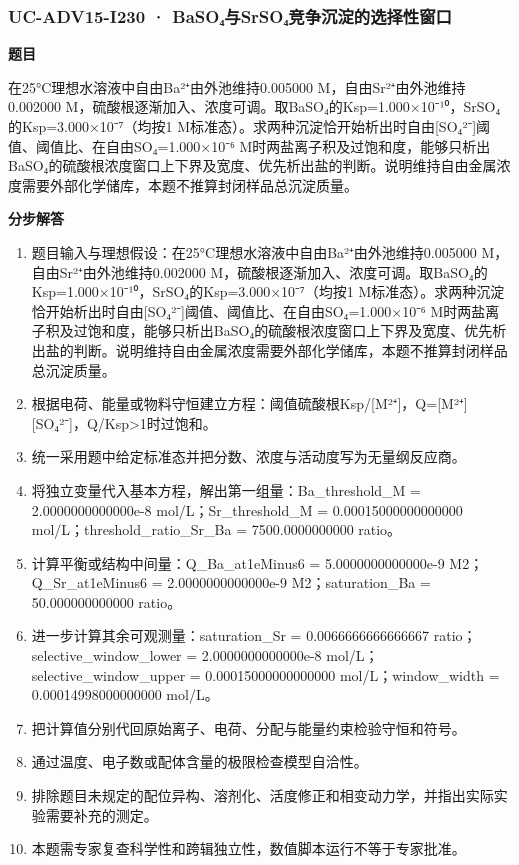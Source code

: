 \documentclass[UTF8,11pt,a4paper]{ctexart}
\begin{document}
\subsubsection*{UC-ADV15-I230 · BaSO₄与SrSO₄竞争沉淀的选择性窗口}
\noindent\textbf{题目}\par
在25°C理想水溶液中自由Ba²⁺由外池维持0.005000 M，自由Sr²⁺由外池维持0.002000 M，硫酸根逐渐加入、浓度可调。取BaSO₄的Ksp=1.000×10⁻¹⁰，SrSO₄的Ksp=3.000×10⁻⁷（均按1 M标准态）。求两种沉淀恰开始析出时自由[SO₄²⁻]阈值、阈值比、在自由SO₄=1.000×10⁻⁶ M时两盐离子积及过饱和度，能够只析出BaSO₄的硫酸根浓度窗口上下界及宽度、优先析出盐的判断。说明维持自由金属浓度需要外部化学储库，本题不推算封闭样品总沉淀质量。\par
\medskip\noindent\textbf{分步解答}
\begin{enumerate}
\item 题目输入与理想假设：在25°C理想水溶液中自由Ba²⁺由外池维持0.005000 M，自由Sr²⁺由外池维持0.002000 M，硫酸根逐渐加入、浓度可调。取BaSO₄的Ksp=1.000×10⁻¹⁰，SrSO₄的Ksp=3.000×10⁻⁷（均按1 M标准态）。求两种沉淀恰开始析出时自由[SO₄²⁻]阈值、阈值比、在自由SO₄=1.000×10⁻⁶ M时两盐离子积及过饱和度，能够只析出BaSO₄的硫酸根浓度窗口上下界及宽度、优先析出盐的判断。说明维持自由金属浓度需要外部化学储库，本题不推算封闭样品总沉淀质量。
\item 根据电荷、能量或物料守恒建立方程：阈值硫酸根Ksp/[M²⁺]，Q=[M²⁺][SO₄²⁻]，Q/Ksp>1时过饱和。
\item 统一采用题中给定标准态并把分数、浓度与活动度写为无量纲反应商。
\item 将独立变量代入基本方程，解出第一组量：Ba\_threshold\_M = 2.0000000000000e-8 mol/L；Sr\_threshold\_M = 0.00015000000000000 mol/L；threshold\_ratio\_Sr\_Ba = 7500.0000000000 ratio。
\item 计算平衡或结构中间量：Q\_Ba\_at1eMinus6 = 5.0000000000000e-9 M2；Q\_Sr\_at1eMinus6 = 2.0000000000000e-9 M2；saturation\_Ba = 50.000000000000 ratio。
\item 进一步计算其余可观测量：saturation\_Sr = 0.0066666666666667 ratio；selective\_window\_lower = 2.0000000000000e-8 mol/L；selective\_window\_upper = 0.00015000000000000 mol/L；window\_width = 0.00014998000000000 mol/L。
\item 把计算值分别代回原始离子、电荷、分配与能量约束检验守恒和符号。
\item 通过温度、电子数或配体含量的极限检查模型自洽性。
\item 排除题目未规定的配位异构、溶剂化、活度修正和相变动力学，并指出实际实验需要补充的测定。
\item 本题需专家复查科学性和跨辑独立性，数值脚本运行不等于专家批准。
\end{enumerate}
\end{document}
